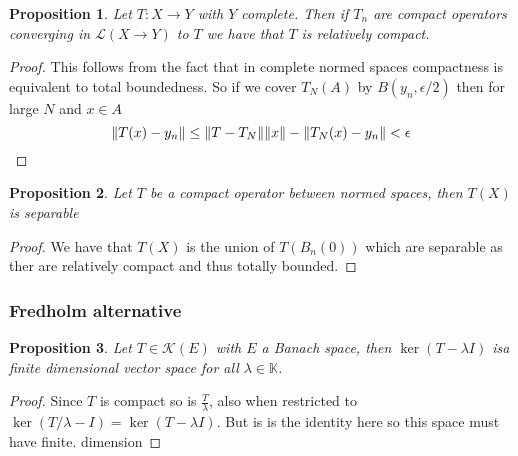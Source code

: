 \documentclass[12pt]{article}
\newtheorem{proposition}{Proposition}
\begin{document}
\begin{proposition}
	Let $T:X\to Y$ with $Y$ complete. Then if $T_n$ are compact operators converging in $\mathcal{L}(X\to Y)$ to $T$ we have that $T$ is relatively compact.
\end{proposition}
\begin{proof}
	This follows from the fact that in complete normed spaces compactness is equivalent to total boundedness. So if we cover $T_N(A)$ by $B(y_n,\epsilon/2)$ then for large $N$ and $x\in A$
	\begin{equation*}
		\norm{T(x)-y_n}\leq \norm{T-T_N}\norm{x}-\norm{T_N(x)-y_n}<\epsilon
	\end{equation*}
\end{proof}
\begin{proposition}
	Let $T$ be a compact operator between normed spaces, then $T(X)$ is separable
\end{proposition}
\begin{proof}
	We have that $T(X)$ is the union of $T(B_n(0))$ which are separable as ther are relatively compact and thus totally bounded.
\end{proof}
\subsubsection{Fredholm alternative}
\begin{proposition}
	Let $T\in\mathcal{K}(E)$ with $E$ a Banach space, then $\ker(T-\lambda I)$ isa finite dimensional vector space for all $\lambda\in\mathbb{K}$.
\end{proposition}
\begin{proof}
	Since $T$ is compact so is $\frac{T}{\lambda}$, also when restricted to $\ker(T/\lambda-I)=\ker(T-\lambda I)$. But is is the identity here so this space must have finite. dimension
\end{proof}
\end{document}
